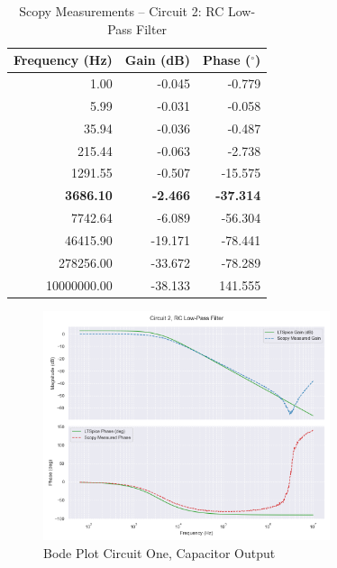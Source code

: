 \documentclass[12pt]{article}
\begin{document}
\begin{table}[H]
	\centering
	\begin{tabular}{|r|r|r|}
		\hline
		\textbf{Frequency (Hz)} & \textbf{Gain (dB)} & \textbf{Phase ($^\circ$)} \\
		\hline
		1.00                    & -0.045             & -0.779                    \\
		5.99                    & -0.031             & -0.058                    \\
		35.94                   & -0.036             & -0.487                    \\
		215.44                  & -0.063             & -2.738                    \\
		1291.55                 & -0.507             & -15.575                   \\
		\textbf{3686.10}        & \textbf{-2.466}    & \textbf{-37.314}          \\
		7742.64                 & -6.089             & -56.304                   \\
		46415.90                & -19.171            & -78.441                   \\
		278256.00               & -33.672            & -78.289                   \\
		10000000.00             & -38.133            & 141.555                   \\
		\hline
	\end{tabular}
	\caption{Scopy Measurements – Circuit 2: RC Low-Pass Filter}
	\label{tab:circuittwo}
\end{table}
\begin{figure}[H]
	\centering
	\includegraphics[width=0.75\textwidth]{e6_bode2}
	\caption{Bode Plot Circuit One, Capacitor Output}
	\label{fig:scopycirc2}
\end{figure}
\end{document}
